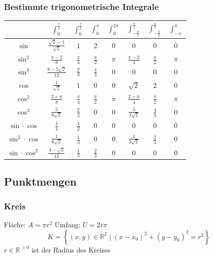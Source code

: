 \documentclass[8pt, a4paper, landscape, fleqn]{scrartcl}
\begin{document}
\begin{multicols*}{3}
				\subsubsection{Bestimmte trigonometrische Integrale}
				    \hspace{10pt}
				    \begin{tabular}{|c|c|c|c|c|c|c|c|}
						\hline
						&$\int_0^{\frac{\pi}{4}}$ &$\int_0^{\frac{\pi}{2}}$ &$\int_0^{\pi}$ &$\int_0^{2\pi}$ &$\int_{-\frac{\pi}{4}}^{\frac{\pi}{4}}$ &$\int_{-\frac{\pi}{2}}^{\frac{\pi}{2}}$ &$\int_{-\pi}^{\pi}$ \\
						\hline
						$\sin$ &$\frac{\sqrt{2}-1}{\sqrt{2}}$ &$1$ &$2$ &$0$ &$0$ &$0$ &$0$\\
						\hline
						$\sin^2$ &$\frac{\pi-2}{8}$ &$\frac{\pi}{4}$ &$\frac{\pi}{2}$ &$\pi$ &$\frac{\pi-2}{4}$ &$\frac{\pi}{2}$ &$\pi$\\
						\hline
						$\sin^3$ &$\frac{8-5\sqrt{2}}{12}$ &$\frac{2}{3}$ &$\frac{4}{3}$ &$0$ &$0$ &$0$ &$0$\\
						\hline
						$\cos$ &$\frac{1}{\sqrt{2}}$ &$1$ &$0$ &$0$ &$\sqrt{2}$ &$2$ &$0$\\
						\hline
						$\cos^2$ &$\frac{2+\pi}{8}$ &$\frac{\pi}{4}$ &$\frac{\pi}{2}$ &$\pi$ &$\frac{2+\pi}{4}$ &$\frac{\pi}{2}$ &$\pi$ \\
						\hline
						$\cos^3$ &$\frac{5}{6\sqrt{2}}$ &$\frac{2}{3}$ &$0$ &$0$ &$\frac{5}{3\sqrt{2}}$ &$\frac{4}{3}$ &$0$\\
						\hline 
						$\sin \cdot \cos$ &$\frac{1}{4}$ &$\frac{1}{2}$ &$0$ &$0$ &$0$ &$0$ &$0$ \\
						\hline 
						$\sin^2 \cdot \cos$&$\frac{1}{6\sqrt{2}}$ &$\frac{1}{3}$ &$0$ &$0$ &$\frac{1}{3\sqrt{2}}$ &$\frac{2}{3}$ &$0$ \\
						\hline 
						$\sin \cdot \cos^2$ &$\frac{4-\sqrt{2}}{12}$ &$\frac{1}{3}$ &$\frac{2}{3}$ &$0$ &$0$ &$0$ &$0$ \\
						\hline 
					\end{tabular}
					\vspace{10pt}
			\subsection{Punktmengen}
				\subsubsection{Kreis}
					Fläche: $A=\pi r^2$ \hspace{30pt} Umfang: $U=2r\pi$
					\[K=\left\{(x, y)\in \mathbb{R}^2 \mid (x-x_0)^2+(y-y_0)^2 = r^2 \right\}\]	
					$r \in \mathbb{R}^{>0}$ ist der Radius des Kreises

\end{multicols*}
\end{document}
